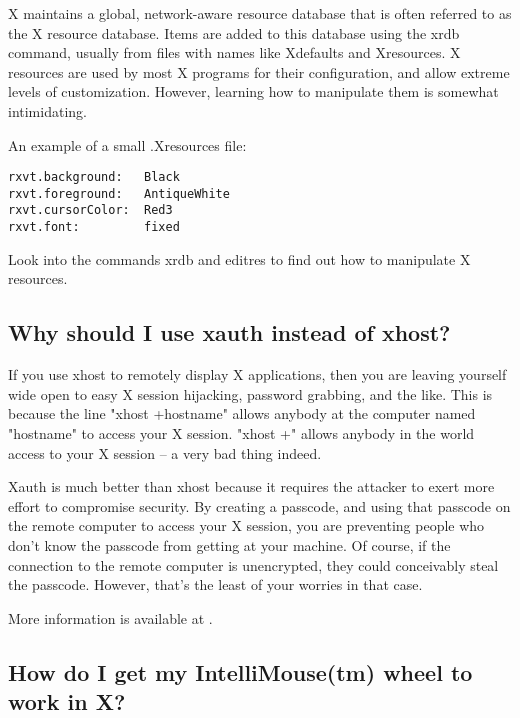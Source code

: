 \documentclass[a4paper]{article}
\begin{document}
X maintains a global, network-aware resource database that is often
referred to as the X resource database.  Items are added to this
database using the xrdb command, usually from files with names like
Xdefaults and Xresources. X resources are used by most X programs for
their configuration, and allow extreme levels of customization.
However, learning how to manipulate them is somewhat intimidating.

An example of a small .Xresources file:

\begin{tscreen}
\begin{verbatim}
rxvt.background:   Black
rxvt.foreground:   AntiqueWhite
rxvt.cursorColor:  Red3
rxvt.font:         fixed
\end{verbatim}
\end{tscreen}


Look into the commands xrdb and editres to find out how to manipulate X
resources.




\subsection{Why should I use xauth instead of xhost?}

If you use xhost to remotely display X applications, then you are
leaving yourself wide open to easy X session hijacking, password
grabbing, and the like.  This is because the line "xhost +hostname"
allows anybody at the computer named "hostname" to access your X
session.  "xhost +" allows anybody in the world access to your X session 
-- a very bad thing indeed.

Xauth is much better than xhost because it requires the attacker to
exert more effort to compromise security.  By creating a passcode, and
using that passcode on the remote computer to access your X session, you 
are preventing people who don't know the passcode from getting at your
machine.  Of course, if the connection to the remote computer is
unencrypted, they could conceivably steal the passcode.  However, that's 
the least of your worries in that case.

More information is available at .




\subsection{How do I get my IntelliMouse(tm) wheel to work in X?}
\end{document}
